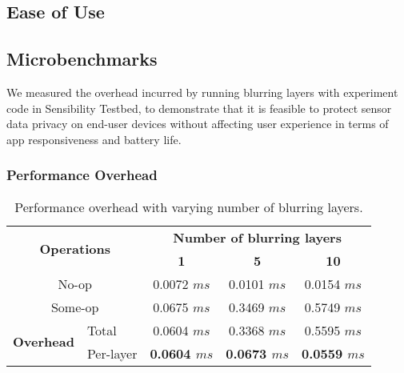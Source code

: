\subsection{Ease of Use}\label{sec-ease}




\subsection{Microbenchmarks}\label{sec-benchmark}

We measured the overhead incurred by running blurring layers with 
experiment code in Sensibility Testbed, to demonstrate that it is 
feasible to protect sensor data privacy on end-user devices without 
affecting user experience in terms of app responsiveness and battery life.

\subsubsection{Performance Overhead}

\begin{table}
\scriptsize
\centering

\bgroup
\def\arraystretch{1.15}%
\begin{tabular}{|l|l|c|c|c|}
\hline
\multicolumn{2}{|c|}{\multirow{2}{*}{\bf Operations}} & 
\multicolumn{3}{c|}{\bf Number of blurring layers} \\\cline{3-5}
\multicolumn{2}{|c|}{} & {\bf 1} & {\bf 5} & {\bf 10} \\\hline

\multicolumn{2}{|c|}{No-op} & 0.0072 $ms$ & 0.0101 $ms$ & 0.0154 $ms$ \\ 

\multicolumn{2}{|c|}{Some-op} & 0.0675 $ms$ & 0.3469 $ms$  & 0.5749 $ms$ \\ \hline

\multirow{2}{*}{\bf Overhead} & Total & 0.0604 $ms$ & 0.3368 $ms$  & 0.5595 $ms$ \\ \cline{2-5}

& Per-layer & {\bf 0.0604 $ms$} & {\bf 0.0673 $ms$} & {\bf 0.0559 $ms$} \\ \hline

\end{tabular}
\egroup

\caption{\small Performance overhead with varying number of blurring layers. }
\label{tab:overhead}
\end{table}

